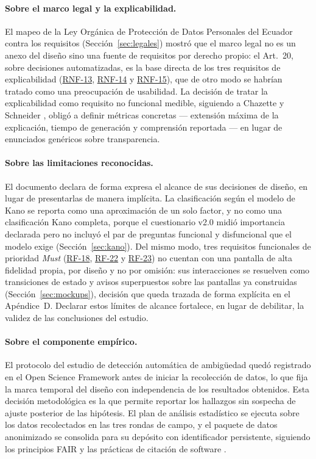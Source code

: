 \documentclass[journal,onecolumn]{IEEEtran}
\begin{document}
	\paragraph{Sobre el marco legal y la explicabilidad.}
	El mapeo de la Ley Orgánica de Protección de Datos Personales del Ecuador
	\cite{lopdp2021} contra los requisitos (Sección~\ref{sec:legales}) mostró que
	el marco legal no es un anexo del diseño sino una fuente de requisitos por
	derecho propio: el Art.~20, sobre decisiones automatizadas, es la base
	directa de los tres requisitos de explicabilidad (\hyperref[tab:RNF-13]{RNF-13}, \hyperref[tab:RNF-14]{RNF-14} y \hyperref[tab:RNF-15]{RNF-15}),
	que de otro modo se habrían tratado como una preocupación de usabilidad. La
	decisión de tratar la explicabilidad como requisito no funcional medible,
	siguiendo a Chazette y Schneider \cite{chazette2020}, obligó a definir
	métricas concretas --- extensión máxima de la explicación, tiempo de
	generación y comprensión reportada --- en lugar de enunciados genéricos sobre
	transparencia.
	
	\paragraph{Sobre las limitaciones reconocidas.}
	El documento declara de forma expresa el alcance de sus decisiones de
	diseño, en lugar de presentarlas de manera implícita. La clasificación
	según el modelo de Kano se reporta como una aproximación de un solo
	factor, y no como una clasificación Kano completa, porque el cuestionario
	v2.0 midió importancia declarada pero no incluyó el par de preguntas
	funcional y disfuncional que el modelo exige (Sección~\ref{sec:kano}).
	Del mismo modo, tres requisitos funcionales de prioridad \emph{Must}
	(\hyperref[tab:RF-18]{RF-18}, \hyperref[tab:RF-22]{RF-22} y \hyperref[tab:RF-23]{RF-23}) no cuentan con una pantalla de alta fidelidad
	propia, por diseño y no por omisión: sus interacciones se resuelven como
	transiciones de estado y avisos superpuestos sobre las pantallas ya
	construidas (Sección~\ref{sec:mockups}), decisión que queda trazada de
	forma explícita en el Apéndice~D. Declarar estos límites de alcance
	fortalece, en lugar de debilitar, la validez de las conclusiones del
	estudio.
	
	\paragraph{Sobre el componente empírico.}
	El protocolo del estudio de detección automática de ambigüedad quedó
	registrado en el Open Science Framework antes de iniciar la recolección de
	datos, lo que fija la marca temporal del diseño con independencia de los
	resultados obtenidos. Esta decisión metodológica es la que permite
	reportar los hallazgos sin sospecha de ajuste posterior de las
	hipótesis. El plan de análisis estadístico se ejecuta
	sobre los datos recolectados en las tres rondas de campo, y el paquete de
	datos anonimizado se consolida para su depósito con identificador
	persistente, siguiendo los principios FAIR \cite{wilkinson2016} y las
	prácticas de citación de software \cite{smith2016}.
	
\end{document}
